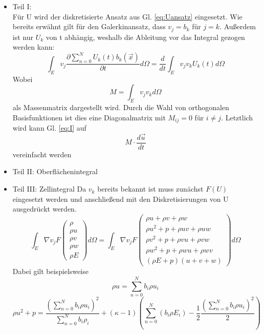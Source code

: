 \begin{itemize}
	\item Teil I:\\
	Für U wird der diskretisierte Ansatz aus Gl. \ref{eq:Uansatz} eingesetzt. Wie bereits erwähnt gilt für den Galerkinansatz, dass $v_{j}=b_{k}$ für $j=k$. Außerdem ist nur $U_{k}$ von t abhängig, weshalb die Ableitung vor das Integral gezogen werden kann:
	\begin{equation}\label{eq:I}
		\int_{E} v_{j} \frac{\partial \sum_{n=0}^{N} U_{k}(t)b_ {k}(\vec{x})}{\partial t} d\Omega=	\frac{d}{d t}\int_{E} v_{j} v_{k} U_{k}(t) d\Omega
	\end{equation}
	Wobei 
	\begin{equation}\label{eq:massenmatrix}
		M = \int_{E} v_{j} v_{k} d\Omega
	\end{equation}
	als Massenmatrix dargestellt wird. Durch die Wahl von orthogonalen Basisfunktionen ist dies eine Diagonalmatrix mit $M_{ij}=0$ für $i \neq j$. Letztlich wird kann Gl. \ref{eq:I} auf
	\begin{equation}\label{key}
		M \cdot \frac{d \vec{u}}{d t}
	\end{equation}
	vereinfacht werden
	
	\item Teil II: Oberflächenintegral
	
	\item Teil III: Zellintegral
	Da $v_{k}$ bereits bekannt ist muss zunächst $F(U)$ eingesetzt werden und anschließend mit den Diskretisierungen von U ausgedrückt werden.
	\begin{equation}\label{eq:III}
		\int_{E}\nabla v_{j}F \left(\begin{array}{c} \rho \\ \rho u\\ \rho v \\ \rho w \\ \rho E\end{array}\right)d\Omega =
		\int_{E}\nabla v_{j}F \left(\begin{array}{c} \rho u + \rho v + \rho w \\ \rho u^2 + p + \rho u v + \rho u w \\ \rho v^2 + p + \rho v u + \rho v w \\
		 \rho w^2 + p + \rho w u + \rho w v \\ (\rho E+p)(u+v+w)\end{array}\right)d\Omega 
	\end{equation}
	Dabei gilt beispielsweise
	\begin{equation}\label{eq:AnsatzRhoU}
		\rho u = \sum_{n=0}^{N} b_{i} \rho u_{i} 
	\end{equation}
	\begin{equation}\label{eq:AnsatzRhoU^2p}
			\rho u^{2} + p = \frac{(\sum_{n=0}^{N} b_{i} \rho u_{i})^{2}}{\sum_{n=0}^{N} b_{i}\rho_{i}}+(\kappa-1)(\sum_{n=0}^{N} (b_{i} \rho E_{i}) - \frac{1}{2} \frac{(\sum_{n=0}^{N} b_{i} \rho u_{i})^{2}}{2})
	\end{equation}
\end{itemize}
